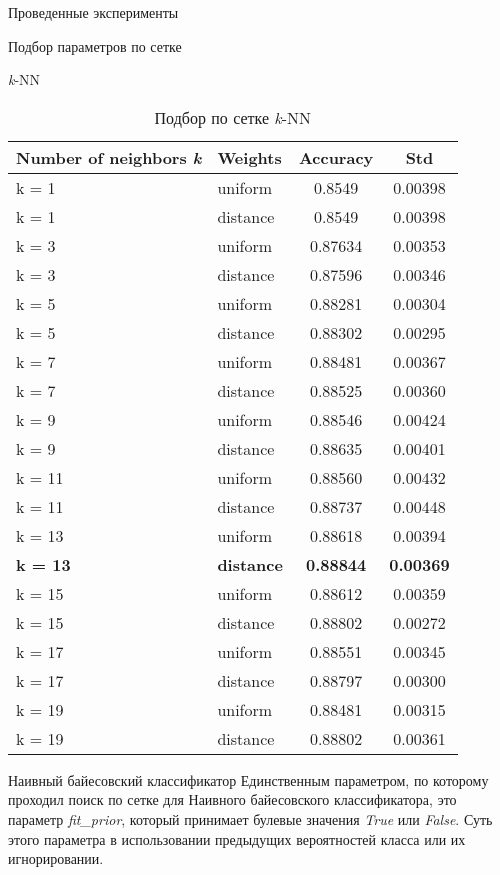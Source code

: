 \begin{section}{Проведенные эксперименты}
\begin{subsection}{Подбор параметров по сетке}
\begin{subsubsection}{\textit{k}-NN}
  \begin{table}[H]
  \centering
  {\begin{tabular}{|l|l|c|c|}
  \hline
  \textbf{Number of neighbors \textit{k}} & \textbf{Weights} & \textbf{Accuracy} & \textbf{Std} \\
  \hline
  k = 1 & uniform  & 0.8549 & 0.00398 \\
  \hline
  k = 1 & distance  & 0.8549 & 0.00398 \\
  \hline
  k = 3 & uniform  & 0.87634 & 0.00353 \\
  \hline
  k = 3 &  distance & 0.87596  & 0.00346 \\
  \hline
  k = 5 & uniform  & 0.88281 & 0.00304 \\
  \hline
  k = 5 & distance  & 0.88302 & 0.00295 \\
  \hline
  k = 7 & uniform  & 0.88481 & 0.00367 \\
  \hline
  k = 7 &  distance & 0.88525  & 0.00360 \\
  \hline
  k = 9 & uniform  & 0.88546 & 0.00424 \\
  \hline
  k = 9 & distance  & 0.88635 & 0.00401 \\
  \hline
  k = 11 & uniform  & 0.88560 & 0.00432 \\
  \hline
  k = 11 &  distance & 0.88737  & 0.00448 \\
  \hline
  k = 13 & uniform  & 0.88618 &  0.00394 \\
  \hline
  \textbf{k = 13} & \textbf{distance}  & \textbf{0.88844} & \textbf{0.00369} \\
  \hline
  k = 15 & uniform  & 0.88612 & 0.00359 \\
  \hline
  k = 15 &  distance & 0.88802  & 0.00272 \\
  \hline
  k = 17 & uniform  & 0.88551 & 0.00345 \\
  \hline
  k = 17 & distance  & 0.88797 & 0.00300 \\
  \hline
  k = 19 & uniform  & 0.88481 & 0.00315 \\
  \hline
  k = 19 &  distance & 0.88802  & 0.00361 \\
  \hline
  \end{tabular}}

  \caption{Подбор по сетке \textit{k}-NN}
  \label{grid:knn}
  \end{table}



\end{subsubsection}


\begin{subsubsection}{Наивный байесовский классификатор}
Единственным параметром, по которому проходил поиск по сетке для Наивного байесовского классификатора, это параметр \textit{fit\_prior}, который принимает булевые значения \textit{True} или \textit{False}. Суть этого параметра в использовании предыдущих вероятностей класса или их игнорировании.


\end{subsubsection}
\end{subsection}
\end{section}
